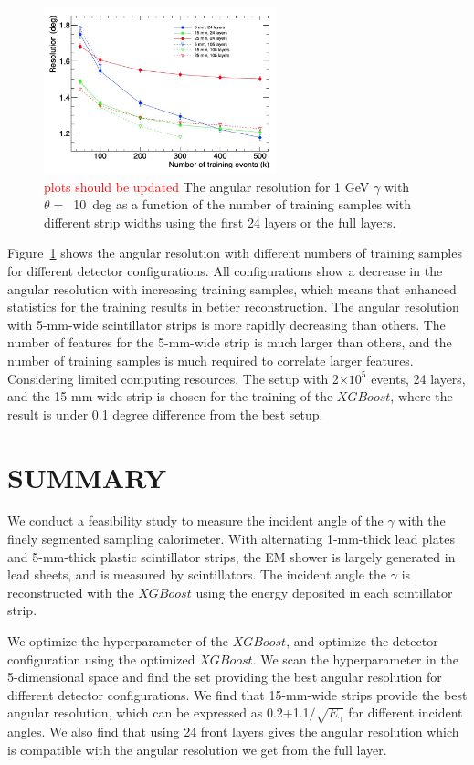 \documentclass[jkps,preprint,fleqn,showpacs,showkeys]{revtex4}
\newcommand{\XGB}{XGBoost}
\begin{document}
\begin{figure}[!hbt]
\includegraphics[width=0.6\textwidth]{figures/layer-event.jpg}
\caption{  \textcolor{red}{plots should be updated} The angular resolution for 1 GeV $\gamma$ with $\theta=$~10~deg as a function of the number of training samples with different strip widths using the first 24 layers or the full layers. }
\label{fig:multi-parameter}
\end{figure}

Figure~\ref{fig:multi-parameter} shows the angular resolution with different numbers of training samples for different detector configurations. All configurations show a decrease in the angular resolution with increasing training samples, which means that enhanced statistics for the training results in better reconstruction. The angular resolution with 5-mm-wide scintillator strips is more rapidly decreasing than others. The number of features for the 5-mm-wide strip is much larger than others, and the number of training samples is much required to correlate larger features. Considering limited computing resources, The setup with 2$\times10^{5}$ events, 24 layers, and the 15-mm-wide strip is chosen for the training of the $\XGB$, where the result is under 0.1 degree difference from the best setup.
 
\section{SUMMARY}
\label{sec:sum}

We conduct a feasibility study to measure the incident angle of the $\gamma$ with the finely segmented sampling calorimeter. With alternating 1-mm-thick lead plates and 5-mm-thick plastic scintillator strips, the EM shower is largely generated in lead sheets, and is measured by scintillators. The incident angle the $\gamma$ is reconstructed with the $\XGB$ using the energy deposited in each scintillator strip.

We optimize the hyperparameter of the $\XGB$, and optimize the detector configuration using the optimized $\XGB$. We scan the hyperparameter in the 5-dimensional space and find the set providing the best angular resolution for different detector configurations. We find that 15-mm-wide strips provide the best angular resolution, which can be expressed as 0.2+1.1$/ \sqrt{E_\gamma}$ for different incident angles. We also find that using 24 front layers gives the angular resolution which is compatible with the angular resolution we get from the full layer.
\end{document}
